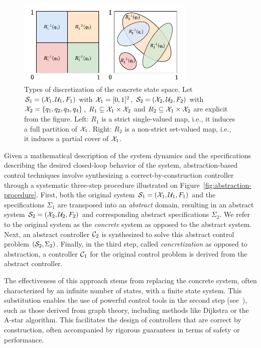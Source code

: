 \documentclass{juliacon}
\begin{document}
\begin{figure}[t]
\centerline{\includegraphics[width=8.5cm]{Figures/Abstraction/strict-cover-partition.pdf}}
\caption{Types of discretization of the concrete state space.
    Let $\mathcal{S}_{1} = (\mathcal{X}_1,\mathcal{U}_1,F_1)$ with $\mathcal{X}_1 = [0,1]^2$, $\mathcal{S}_{2} = (\mathcal{X}_2,\mathcal{U}_2,F_2)$ with $\mathcal{X}_2 = \{q_1,q_2,q_3,q_4\}$, $R_1 \subseteq \mathcal{X}_1\times \mathcal{X}_2$ and $R_2 \subseteq \mathcal{X}_1\times \mathcal{X}_2$ are explicit from the figure.
    Left: $R_1$ is a strict single-valued map, i.e., it induces a full partition of $\mathcal{X}_1$. Right: $R_2$ is a non-strict set-valued map, i.e., it induces a partial cover of $\mathcal{X}_1$.}
	\label{fig:discretization}
\end{figure}

Given a mathematical description of the system dynamics and the specifications describing the desired closed-loop behavior of the system, abstraction-based control techniques involve synthesizing a correct-by-construction controller through a systematic three-step procedure illustrated on Figure~\ref{fig:abstraction-procedure}. 
First, both the original system $\mathcal{S}_1=(\mathcal{X}_1,\mathcal{U}_1,F_1)$ and the specifications $\Sigma_1$ are transposed into an \emph{abstract} domain, resulting in an abstract system $\mathcal{S}_2=(\mathcal{X}_2,\mathcal{U}_2,F_2)$ and corresponding abstract specifications $\Sigma_2$. We refer to the original system as the \emph{concrete} system as opposed to the abstract system. 
Next, an abstract controller $\mathcal{C}_2$ is synthesized to solve this abstract control problem $(\mathcal{S}_2,\Sigma_2)$. 
Finally, in the third step, called \emph{concretization} as opposed to abstraction, a controller $\mathcal{C}_1$ for the original control problem is derived from the abstract controller.

\vskip 6pt
The effectiveness of this approach stems from replacing the concrete system, often characterized by an infinite number of states, with a finite state system. This substitution enables the use of powerful control tools in the second step (see~\cite{belta2017formal,kupferman2001model}), such as those derived from graph theory, including methods like Dijkstra or the A-star algorithm. This facilitates the design of controllers that are correct by construction, often accompanied by rigorous guarantees in terms of safety or performance.
\end{document}
